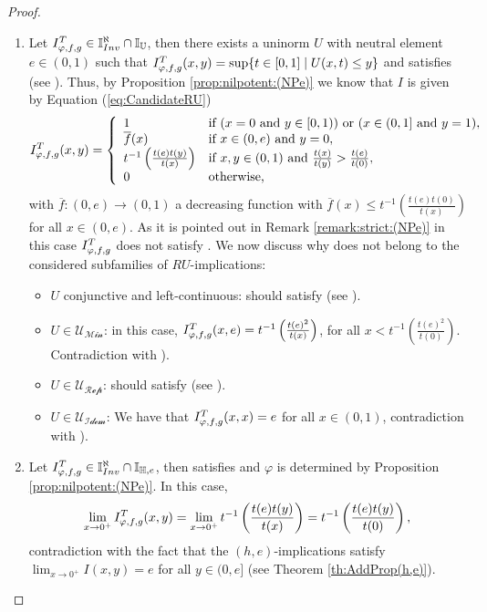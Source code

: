 \begin{proof}
\begin{enumerate}[label=(\roman*)]
		\item  Let $I^T_{\varphi,f,g} \in \mathbb{I}^{\aleph}_{Inv} \cap \mathbb{I}_{\mathbb{U}}$, then there exists a uninorm $U$ with neutral element $e \in (0,1)$ such that $I^T_{\varphi,f,g}(x,y)=\sup \{t \in [0,1] \mid U(x,t) \leq y\}$ and \IT satisfies \NPe (see \cite[Proposition~5.4.2]{Baczynski2008}). Thus, by Proposition \ref{prop:nilpotent:(NPe)} we know that $I$ is given by Equation (\ref{eq:CandidateRU})
		\begin{equation*}
			I^T_{\varphi,f,g}(x,y)
			=
			\left\{ \begin{array}{ll}
				1 & \text{if } (x=0 \text{ and } y \in [0,1)) \text{ or } (x \in (0,1] \text{ and } y=1),\\
				\overline{f}(x) & \text{if }   x \in (0,e) \text{ and } y=0, \\
				t^{-1} \left(\frac{t(e)t(y)}{t(x)}\right) &  \text{if } x,y \in (0,1) \text{ and } \frac{t(x)}{t(y)} > \frac{t(e)}{t(0)}, \\
				0 & \text{otherwise,}				
			\end{array}
			\right.
		\end{equation*}
		with $\overline{f}:(0,e) \to (0,1)$ a decreasing function with $\overline{f}(x) \leq t^{-1} \left(\frac{t(e)t(0)}{t(x)}\right)$ for all $x \in (0,e)$. As it is pointed out in Remark \ref{remark:strict:(NPe)} in this case $I^T_{\varphi,f,g}$ does not satisfy \EP. We now discuss why \IT does not belong to the considered subfamilies of $RU$-implications:
		\begin{itemize}
			\item $U$ conjunctive and left-continuous: \IT should satisfy \EP (see \cite[Proposition~5.4.5]{Baczynski2008}).
			\item $U \in \mathcal{U_{\text{Min}}}$: in this case, $I^T_{\varphi,f,g}(x,e)= t^{-1} \left(\frac{t(e)^2}{t(x)}\right)$, for all $x < t^{-1}\left(\frac{t(e)^2}{t(0)}\right)$. Contradiction with \cite[(ii)-Remark~5.4.9]{Baczynski2008}).
			\item $U \in \mathcal{U_{\text{Rep}}}$: \IT should satisfy \EP (see \cite[Lemma~5.4.12]{Baczynski2008}).
			\item $U \in \mathcal{U_{\text{Idem}}}$: We have that $I^T_{\varphi,f,g}(x,x)=e$ for all $x \in (0,1)$, contradiction with  \cite[(i)-Proposition~5.4.22]{Baczynski2008}).
		\end{itemize}
		\item Let $I^T_{\varphi,f,g} \in \mathbb{I}^{\aleph}_{Inv} \cap \mathbb{I}_{\mathbb{H},e}$, then \IT satisfies \NPe and $\varphi$ is determined by Proposition \ref{prop:nilpotent:(NPe)}. In this case,
		$$\lim_{x \to 0^+} I^T_{\varphi,f,g}(x,y) = \lim_{x \to 0^+} t^{-1} \left(\frac{t(e)t(y)}{t(x)}\right) = t^{-1} \left(\frac{t(e)t(y)}{t(0)}\right),$$
		contradiction with the fact that the $(h,e)$-implications satisfy $\displaystyle \lim_{x \to 0^+} I(x,y)=e$ for all $y \in (0,e]$ (see Theorem \ref{th:AddProp(h,e)}).
	\end{enumerate}
\end{proof}
